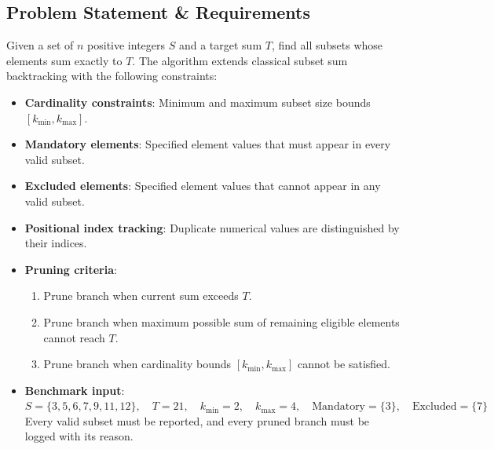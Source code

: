 \documentclass[12pt]{article}
\begin{document}
\subsection{Problem Statement \& Requirements}
Given a set of $n$ positive integers $S$ and a target sum $T$, find all subsets whose elements sum exactly to $T$. The algorithm extends classical subset sum backtracking with the following constraints:
\begin{itemize}
    \item \textbf{Cardinality constraints}: Minimum and maximum subset size bounds $[k_{\min}, k_{\max}]$.
    \item \textbf{Mandatory elements}: Specified element values that must appear in every valid subset.
    \item \textbf{Excluded elements}: Specified element values that cannot appear in any valid subset.
    \item \textbf{Positional index tracking}: Duplicate numerical values are distinguished by their indices.
    \item \textbf{Pruning criteria}:
    \begin{enumerate}
        \item Prune branch when current sum exceeds $T$.
        \item Prune branch when maximum possible sum of remaining eligible elements cannot reach $T$.
        \item Prune branch when cardinality bounds $[k_{\min}, k_{\max}]$ cannot be satisfied.
    \end{enumerate}
    \item \textbf{Benchmark input}:
    $S = \{3, 5, 6, 7, 9, 11, 12\}, \quad T = 21, \quad k_{\min} = 2, \quad k_{\max} = 4, \quad \text{Mandatory} = \{3\}, \quad \text{Excluded} = \{7\}$
    Every valid subset must be reported, and every pruned branch must be logged with its reason.
\end{itemize}
\end{document}
